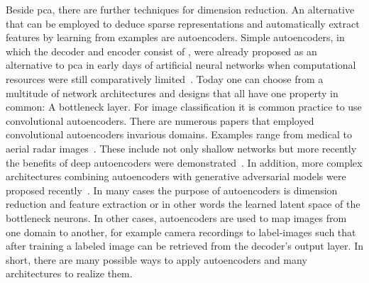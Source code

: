 Beside \acrshort{pca}, there are further techniques for dimension reduction. An alternative that can be employed to deduce sparse representations and automatically extract features by learning from examples are autoencoders. Simple autoencoders, in which the decoder and encoder consist of , were already proposed as an alternative to \acrshort{pca} in early days of artificial neural networks when computational resources were still comparatively limited~\citep{kramer1991nonlinear}. Today one can choose from a multitude of network architectures and designs that all have one property in common: A bottleneck layer. For image classification it is common practice to use convolutional autoencoders. There are numerous papers that employed convolutional autoencoders invarious domains. Examples range from medical to aerial radar images~\citep{chen2017deep}. These include not only shallow networks but more recently the benefits of deep autoencoders were demonstrated~\citep{geng2015high}. In addition, more complex architectures combining autoencoders with generative adversarial models were proposed recently~\citep{bao2017cvae}. In many cases the purpose of autoencoders is dimension reduction and feature extraction or in other words the learned latent space of the bottleneck neurons. In other cases, autoencoders are used to map images from one domain to another, for example camera recordings to label-images such that after training a labeled image can be retrieved from the decoder’s output layer\citep{iglovikov2018ternausnet}. In short, there are many possible ways to apply autoencoders and many architectures to realize them.

